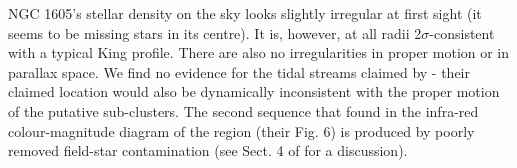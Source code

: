 \documentclass[RNAAS]{aastex631}
\begin{document}
NGC 1605's stellar density on the sky looks slightly irregular at first sight (it seems to be missing stars in its centre). It is, however, at all radii 2$\sigma$-consistent with a typical King profile. There are also no irregularities in proper motion or in parallax space. We find no evidence for the tidal streams claimed by \citet{Camargo2021} - their claimed location would also be dynamically inconsistent with the proper motion of the putative sub-clusters.
The second sequence that \citet{Camargo2021} found in the infra-red colour-magnitude diagram of the region (their Fig. 6) is produced by poorly removed field-star contamination (see Sect. 4 of \citealt{CantatAnders2020} for a discussion).
\end{document}
